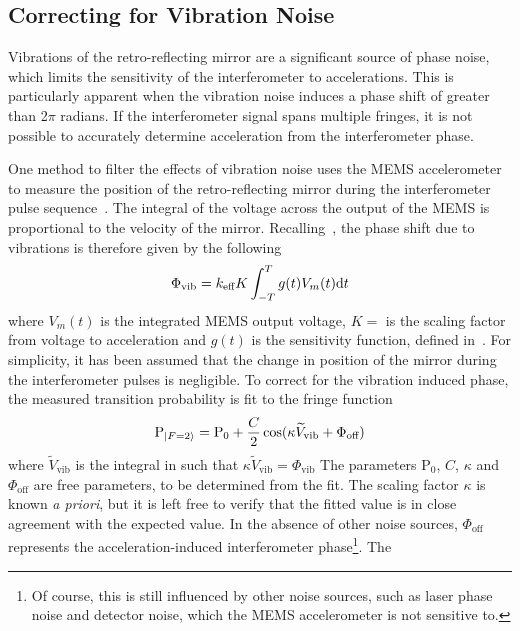 \subsection{Correcting for Vibration Noise}\label{subsec:vibration_sensitivity}
Vibrations of the retro-reflecting mirror are a significant source of
phase noise, which limits the sensitivity of the interferometer to
accelerations. This is particularly apparent when the vibration noise
induces a phase shift of greater than 2\(\pi\) radians. If the
interferometer signal spans multiple fringes, it is not possible to
accurately determine acceleration from the interferometer phase.
\par\noindent
One method to filter the effects of vibration noise uses the MEMS
accelerometer to measure the position of the retro-reflecting mirror
during the interferometer pulse sequence~\cite{Merlet2009}. The
integral of the voltage across the output of the MEMS is proportional
to the velocity of the mirror.
Recalling~, the phase shift due to
vibrations is therefore given by the following
\begin{equation}
  \Phi_\textnormal{vib} =  k_\text{eff} K\int_{-T}^{T} g(t) V_m(t)
  \mathrm{d}t
  \label{eq:phase_vib}
\end{equation}
where \(V_m(t)\) is the integrated MEMS output voltage, \(K = \)
 is the
scaling factor from voltage to acceleration and \(g(t)\) is 
the sensitivity function, defined
in~. For simplicity, it has been
assumed that the change in position of the mirror during the
interferometer pulses is negligible. To correct for the vibration
induced phase, the measured transition probability is
fit to the fringe function
\begin{equation}
  \text{P}_{\ket{F=2}} = \text{P}_0 + \frac{C}{2}\cos(\kappa
  \widetilde{V}_\textnormal{vib} + \Phi_\text{off})
  \label{eq:fringe_fit_vibration}
\end{equation}
where $\widetilde{V}_\text{vib}$ is the integral in
 such that $\kappa \widetilde{V}_\text{vib}
= \Phi_\text{vib}$ The parameters $\text{P}_0$, $C$, $\kappa$ and $\Phi_\text{off}$ are free
parameters, to be determined from the fit. The scaling factor $\kappa$ is known \textit{a priori},
but it is left free to verify that the fitted value is in close
agreement with the expected value. In the absence of other noise sources,
$\Phi_\text{off}$ represents the acceleration-induced interferometer
phase\footnote{Of course, this is still influenced by other noise
  sources, such as laser phase noise and detector noise, which the
MEMS accelerometer is not sensitive to.}. The
